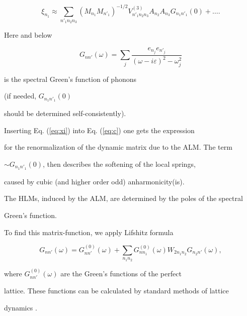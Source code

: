 \begin{equation}

\xi_{n_{1}}\approx  \sum_{n'_{1} n_{2} n_{3}}

(M_{n_{1}} M_{n'_{1}})^{-1/2} V^{(3)}_{n'_{1} n_{2} n_{3}} 

A_{n_{2}} A_{n_{3}}

G_{n_{1} n'_{1}}(0) + \ldots. \label{eq:xi}

\end{equation}

Here and below 

$$

G_{n n'} (\omega) = \sum_j \frac{e_{n_{j}} e_{n'_{j}}}{(\omega -

i \varepsilon)^2 - \omega_{j}^2}

$$

is the spectral Green's function of phonons

\cite{economou,maradudin} (if needed, $G_{n_{1} n'_{1}}(0)$ 

should be determined self-consistently).

Inserting Eq. (\ref{eq:xi}) into Eq. (\ref{eq:c}) one gets the expression 

for the renormalization of the dynamic matrix due to the ALM. The term

$\sim G_{n_1 n'_1}(0)$, then describes the softening of the local springs,

caused by cubic (and higher order odd) anharmonicity(is).  



The HLMs, induced by the ALM, are determined by the poles of the spectral 

Green's function. 

To find this  matrix-function, we apply Lifshitz formula 

\begin{equation}

G_{nn'}(\omega) = G_{nn'}^{(0)}(\omega) + \sum_{n_1 n_2} 

G^{(0)}_{nn_1}(\omega) W_{2n_1 n_2} 

G_{n_{2} n' }(\omega),

\end{equation}

where $G_{nn'}^{(0)}(\omega)$ are the Green's functions of the perfect 

lattice. These functions can be calculated by standard methods of lattice 

dynamics \cite{maradudin}. 

